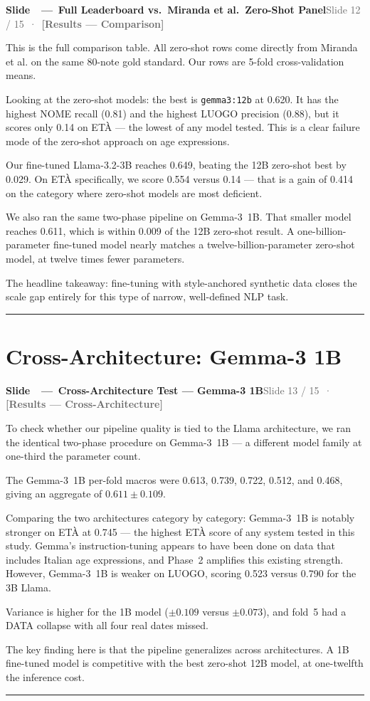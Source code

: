 \documentclass[11pt,a4paper]{article}
\newcommand{\phaselabel}[2]{\textbf{\textcolor{#1}{[#2]}}}
\newcounter{slidectr}
\newcommand{\slidescript}[3]{%
  \stepcounter{slidectr}
  \begin{slidebox}
    \noindent\textbf{Slide \theslidectr\ \,—\, #1}\hfill\small\textcolor{dimgray}{#2}
  \end{slidebox}
  \vspace{0.4em}
  #3
  \vspace{1.2em}
  \noindent\textcolor{dimgray!60}{\rule{\linewidth}{0.4pt}}
  \vspace{0.6em}
}
\begin{document}
\slidescript{Full Leaderboard vs.\ Miranda et al.\ Zero-Shot Panel}{Slide 12 / 15 \,·\, \phaselabel{results}{Results — Comparison}}{

This is the full comparison table. All zero-shot rows come directly from Miranda et al. on the same 80-note gold standard. Our rows are 5-fold cross-validation means.

Looking at the zero-shot models: the best is \texttt{gemma3:12b} at 0.620. It has the highest NOME recall (0.81) and the highest LUOGO precision (0.88), but it scores only 0.14 on ETÀ — the lowest of any model tested. This is a clear failure mode of the zero-shot approach on age expressions.

Our fine-tuned Llama-3.2-3B reaches 0.649, beating the 12B zero-shot best by 0.029. On ETÀ specifically, we score 0.554 versus 0.14 — that is a gain of 0.414 on the category where zero-shot models are most deficient.

We also ran the same two-phase pipeline on Gemma-3~1B. That smaller model reaches 0.611, which is within 0.009 of the 12B zero-shot result. A one-billion-parameter fine-tuned model nearly matches a twelve-billion-parameter zero-shot model, at twelve times fewer parameters.

The headline takeaway: fine-tuning with style-anchored synthetic data closes the scale gap entirely for this type of narrow, well-defined NLP task.

}

\section{Cross-Architecture: Gemma-3 1B}

\slidescript{Cross-Architecture Test — Gemma-3 1B}{Slide 13 / 15 \,·\, \phaselabel{results}{Results — Cross-Architecture}}{

To check whether our pipeline quality is tied to the Llama architecture, we ran the identical two-phase procedure on Gemma-3~1B — a different model family at one-third the parameter count.

The Gemma-3~1B per-fold macros were 0.613, 0.739, 0.722, 0.512, and 0.468, giving an aggregate of $0.611 \pm 0.109$.

Comparing the two architectures category by category: Gemma-3~1B is notably stronger on ETÀ at 0.745 — the highest ETÀ score of any system tested in this study. Gemma's instruction-tuning appears to have been done on data that includes Italian age expressions, and Phase~2 amplifies this existing strength. However, Gemma-3~1B is weaker on LUOGO, scoring 0.523 versus 0.790 for the 3B Llama.

Variance is higher for the 1B model ($\pm 0.109$ versus $\pm 0.073$), and fold~5 had a DATA collapse with all four real dates missed.

The key finding here is that the pipeline generalizes across architectures. A 1B fine-tuned model is competitive with the best zero-shot 12B model, at one-twelfth the inference cost.

}
\end{document}

